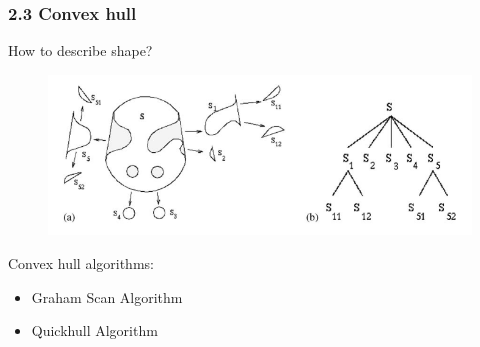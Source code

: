 \documentclass[notheorems,serif,table,compress]{beamer}  %
\begin{document}
\begin{frame}
\frametitle{2.3 Convex hull}
{\color{blue}How to describe shape?}
            \begin{figure}
              \centering
              \includegraphics[width=0.7\linewidth]{hulltree} 
            \end{figure}
    \pause
{\color{blue}Convex hull algorithms}:
    \begin{itemize}
        \item Graham Scan Algorithm
        \item Quickhull Algorithm
    \end{itemize}
\end{frame}
\end{document}
